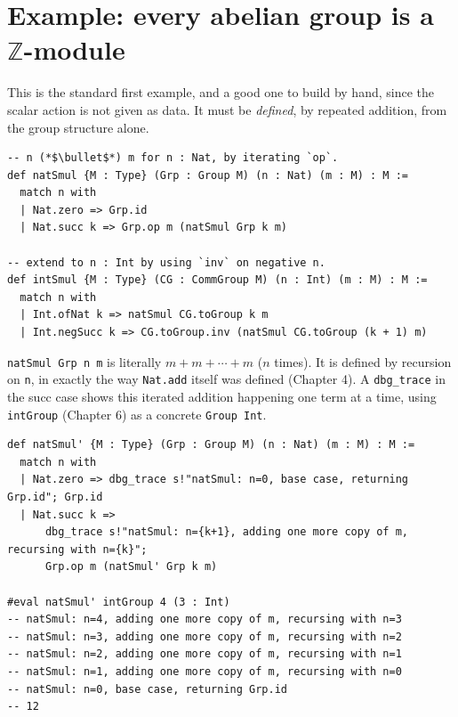 \section{\texorpdfstring{Example: every abelian group is a \(\mathbb{Z}\)-module}{Example: every abelian group is a \textbackslash mathbb\{Z\}-module}}\label{sec:10-modules:03-z-module-example:1}

This is the standard first example, and a good one to build by hand, since the scalar action is not given as data. It must be \emph{defined}, by repeated addition, from the group structure alone.

\begin{lstlisting}
-- n (*$\bullet$*) m for n : Nat, by iterating `op`.
def natSmul {M : Type} (Grp : Group M) (n : Nat) (m : M) : M :=
  match n with
  | Nat.zero => Grp.id
  | Nat.succ k => Grp.op m (natSmul Grp k m)

-- extend to n : Int by using `inv` on negative n.
def intSmul {M : Type} (CG : CommGroup M) (n : Int) (m : M) : M :=
  match n with
  | Int.ofNat k => natSmul CG.toGroup k m
  | Int.negSucc k => CG.toGroup.inv (natSmul CG.toGroup (k + 1) m)
\end{lstlisting}

\texttt{natSmul Grp n m} is literally \(m + m + \cdots + m\) (\(n\) times). It is defined by recursion on \texttt{n}, in exactly the way \texttt{Nat.add} itself was defined (Chapter 4). A \texttt{dbg\_\allowbreak{}trace} in the succ case shows this iterated addition happening one term at a time, using \texttt{intGroup} (Chapter 6) as a concrete \texttt{Group Int}.

\begin{lstlisting}
def natSmul' {M : Type} (Grp : Group M) (n : Nat) (m : M) : M :=
  match n with
  | Nat.zero => dbg_trace s!"natSmul: n=0, base case, returning Grp.id"; Grp.id
  | Nat.succ k =>
      dbg_trace s!"natSmul: n={k+1}, adding one more copy of m, recursing with n={k}";
      Grp.op m (natSmul' Grp k m)

#eval natSmul' intGroup 4 (3 : Int)
-- natSmul: n=4, adding one more copy of m, recursing with n=3
-- natSmul: n=3, adding one more copy of m, recursing with n=2
-- natSmul: n=2, adding one more copy of m, recursing with n=1
-- natSmul: n=1, adding one more copy of m, recursing with n=0
-- natSmul: n=0, base case, returning Grp.id
-- 12
\end{lstlisting}

